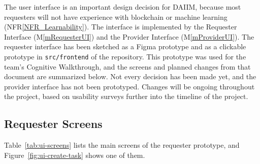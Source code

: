 \documentclass[12pt, titlepage]{article}
\newcommand{\mref}[1]{M\ref{#1}}
\newcommand{\nfrref}[1]{NFR\ref{#1}}
\begin{document}
The user interface is an important design decision for DAIIM, because
most requesters will not have experience with blockchain or machine learning
(\nfrref{NFR_Learnability}). The interface is implemented by the Requester
Interface (\mref{mRequesterUI}) and the Provider Interface
(\mref{mProviderUI}). The requester interface has been sketched as a Figma
prototype and as a clickable prototype in \texttt{src/frontend} of the
repository. This prototype was used for the team's Cognitive Walkthrough, and
the screens and planned changes from that document are summarized below. Not
every decision has been made yet, and the provider interface has not been
prototyped. Changes will be ongoing throughout the project, based on usability 
surveys further into the timeline of the project.

\subsection{Requester Screens}

Table~\ref{tab:ui-screens} lists the main screens of the requester prototype,
and Figure~\ref{fig:ui-create-task} shows one of them.
\end{document}
